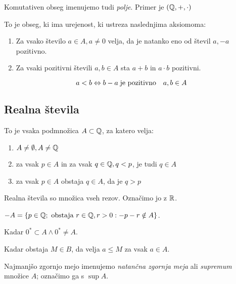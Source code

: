 Komutativen obseg imenujemo tudi \textit{polje}. Primer je $(\mathbb{Q}, +, \cdot)$~


To je obseg, ki ima urejenost, ki ustreza naslednjima aksiomoma:

\begin{enumerate}
	\item Za vsako število $a \in A, a \ne 0$ velja, da je natanko eno od števil $a, -a$ pozitivno.
	\item Za vsaki pozitivni števili $a, b \in A$ sta $a + b$ in $a \cdot b$ pozitivni.
\end{enumerate}


\[
	a < b \Leftrightarrow b - a \; \text{je pozitivno} \quad a, b \in A
\]

\subsection{Realna števila}


To je vsaka podmnožica $A \subset \mathbb{Q}$, za katero velja:
\begin{enumerate}
	\item $A \ne \emptyset, A \ne \mathbb{Q}$
	\item za vsak $p \in A$ in za vsak $q \in \mathbb{Q}, q < p$, je tudi $q \in A$
	\item za vsak $p \in A$ obstaja $q \in A$, da je $q > p$
\end{enumerate}

Realna števila so množica vseh rezov. Označimo jo z $\mathbb{R}$.


$-A = \{p \in \mathbb{Q}; \text{ obstaja } r \in \mathbb{Q}, r > 0: -p-r \notin A \}$.


Kadar $0^* \subset A \land 0^* \ne A$.


Kadar obstaja $M \in B$, da velja $a \le M$ za vsak $a \in A$.

Najmanjšo zgornjo mejo imenujemo \textit{natančna zgornja meja} ali \textit{supremum} množice $A$; označimo ga s $\sup A$.

